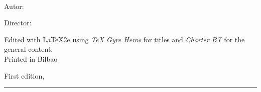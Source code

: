 
\thispagestyle{empty}

\hfill

\vfill

\medskip


\noindent
\textit{\thesistitle}
\\

\noindent
Autor: \authorname

\noindent
Director: \advisorname


\vfill

\vfill

\noindent

\noindent
Edited with \LaTeX2e using \textit{TeX Gyre Heros} for titles and
\textit{Charter BT} for the general content.
\\

\noindent
Printed in Bilbao

\noindent
First edition, 
\monthname \ \the\year

\vspace{1cm}
\hrule
\bigskip

\cleardoublepage

%
%
%
%
%
%

